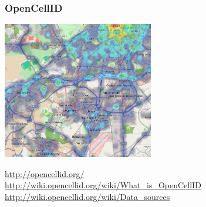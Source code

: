 \begin{frame}
\frametitle{OpenCellID}

\includegraphics[height=6cm]{figs/opencellid-map}

\begin{flushright}
  \url{http://opencellid.org/} \\
  \url{http://wiki.opencellid.org/wiki/What_is_OpenCellID} \\
  \url{http://wiki.opencellid.org/wiki/Data_sources} \\
\end{flushright}
\end{frame}
